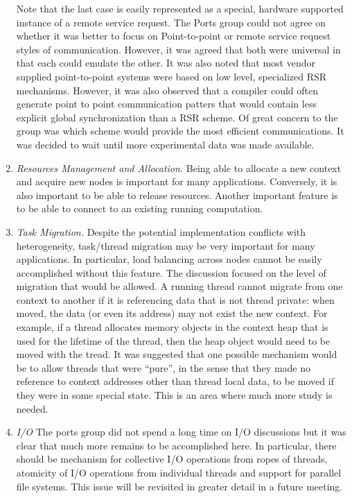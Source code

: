 \begin{enumerate}
\begin{itemize}
\end{itemize} 
Note that the last case is easily represented as a special, hardware
supported instance of a remote service request.  The Ports group could
not agree on whether it was better to focus on Point-to-point or
remote service request styles of communication.  However, it was
agreed that both were universal in that each could emulate the other.
It was also noted that most vendor supplied point-to-point systems were 
based on low level, specialized RSR mechanisms.  However,
it was also observed that a compiler could often generate point
to point communication patters that would contain less explicit
global synchronization  than a RSR scheme.  Of great
concern to the group was which scheme would provide the most
efficient communications. It was decided to wait until more experimental
data was made available.


\item
{\em Resources Management and Allocation.}  Being able to allocate
a new context and acquire new nodes is important for many applications.
Conversely, it is also important to be able to release resources.
Another important feature is to be able to connect to an existing
running computation.

\item
{\em Task Migration.} Despite the potential implementation
conflicts with heterogeneity, task/thread migration may be very
important for many applications.  In particular, load balancing
across nodes cannot be easily accomplished without this feature.
The discussion focused on the level of migration that would be 
allowed.  A running thread cannot migrate from one context to another
if it is referencing data that is not thread private: when moved,
the data (or even its address) may not exist the new context.
For example, if a thread allocates memory objects in the context heap
that is used for the lifetime of the thread, then the heap object
would need to be moved with the tread.
It was suggested that one possible mechanism would be to allow
threads that were ``pure'', in the sense that they made no reference
to context addresses other than thread local data, to be moved
if they were in some special state.  This is an area where
much more study is needed.

\item
{\em I/O } The ports group did not spend a long time on I/O
discussions but it was clear that much more remains to be
accomplished here.  In particular, there should be mechanism
for collective I/O operations from ropes of threads, atomicity
of I/O operations from individual threads and support for
parallel file systems.  This issue will be revisited in greater
detail in a future meeting.

\end{enumerate}

